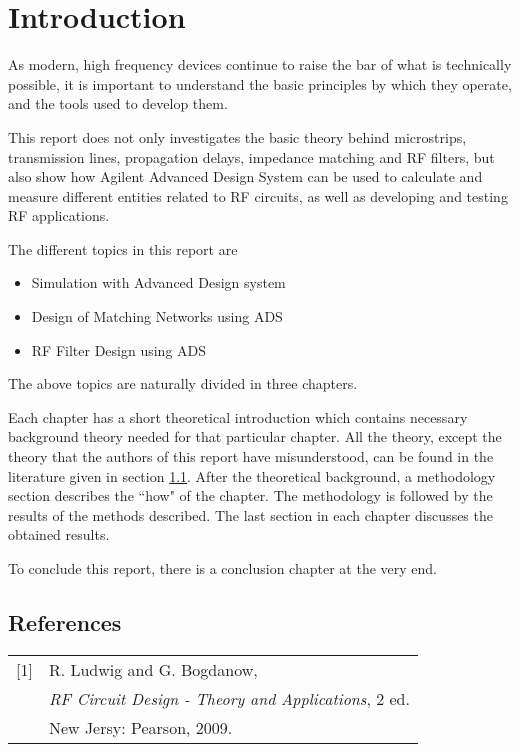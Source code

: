 \documentclass[report.tex]{subfiles}
\begin{document}
\pagebreak \section{Introduction}
As modern, high frequency devices continue to raise the bar of what is technically possible, it is important to understand the basic principles by which they operate, and the tools used to develop them. 

This report does not only investigates the basic theory behind microstrips, transmission lines, propagation delays, impedance matching and RF filters, but also show how Agilent Advanced Design System can be used to calculate and measure different entities related to RF circuits, as well as developing and testing RF applications.

The different topics in this report are
\begin{itemize}
\item Simulation with Advanced Design system
\item Design of Matching Networks using ADS
\item RF Filter Design using ADS
\end{itemize}
The above topics are naturally divided in three chapters.

Each chapter has a short theoretical introduction which contains necessary background theory needed for that particular chapter. All the theory, except the theory that the authors of this report have misunderstood, can be found in the literature given in section \ref{subsec:References}.
After the theoretical background, a methodology section describes the ``how" of the chapter.
The methodology is followed by the results of the methods described.
The last section in each chapter discusses the obtained results.

To conclude this report, there is a conclusion chapter at the very end.

\subsection{References}\label{subsec:References}
\begin{table}[H]
	\begin{tabular}{l l}
		[1] & R. Ludwig and G. Bogdanow, \\
		& \textit{RF Circuit Design - Theory and Applications}, 2 ed. \\
		& New Jersy: Pearson, 2009.
	\end{tabular}
\end{table}
\end{document}
